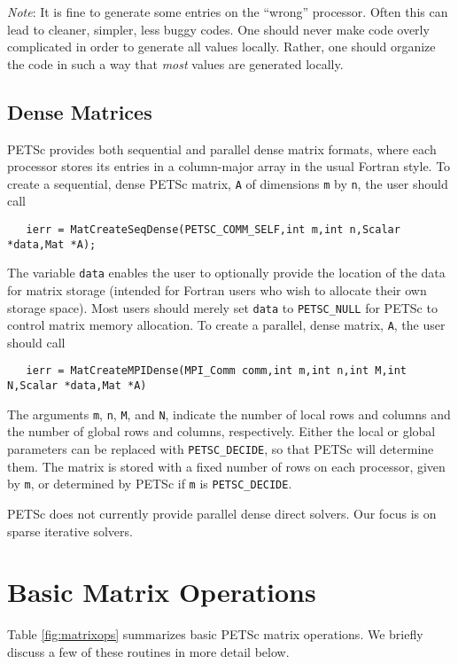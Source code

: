 {\em Note}: It is fine to generate some entries on the ``wrong'' processor. Often
this can lead to cleaner, simpler, less buggy codes.  One should never
make code overly complicated in order to generate all values locally. Rather,
one should organize the code in such a way that {\em most} values are generated locally.

\subsection{Dense Matrices}
\label{sec:matdense}

PETSc provides both sequential and parallel dense matrix formats,
where each processor stores its entries in a column-major array in the
usual Fortran style.  To create a sequential, dense PETSc matrix,
{\tt A} of dimensions {\tt m} by {\tt n}, the user should
call 
\begin{verbatim}
   ierr = MatCreateSeqDense(PETSC_COMM_SELF,int m,int n,Scalar *data,Mat *A);
\end{verbatim}
The variable {\tt data} enables the user to optionally provide the
location of the data for matrix storage (intended for Fortran users who
wish to allocate their own storage space).  Most users should merely
set {\tt data} to {\tt PETSC\_NULL} for PETSc to control matrix memory allocation.
To create a parallel, dense matrix, {\tt A}, the user should call
\begin{verbatim}
   ierr = MatCreateMPIDense(MPI_Comm comm,int m,int n,int M,int N,Scalar *data,Mat *A)
\end{verbatim}
The arguments {\tt m}, {\tt n}, 
{\tt M}, and {\tt N}, indicate the number of local rows and columns and
the number of global rows and columns, respectively. Either the local or
global parameters can be replaced with {\tt PETSC\_DECIDE}, so that 
PETSc will determine  them.
The matrix is stored with a fixed number of rows on 
each processor, given by {\tt m}, or determined by PETSc if {\tt m} is
{\tt PETSC\_DECIDE}. 

PETSc does not currently provide parallel dense direct solvers. Our focus is on 
sparse iterative solvers.

\section{Basic Matrix Operations}
\label{sec:matoptions}

Table \ref{fig:matrixops} summarizes basic PETSc matrix operations.
We briefly discuss a few of these routines in more detail below.

